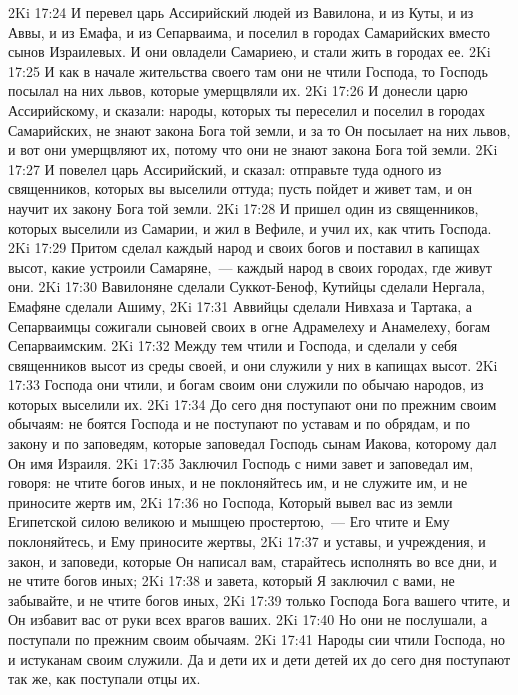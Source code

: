 \rsbpar\vs 2Ki 17:24 И перевел царь Ассирийский людей из Вавилона, и из Куты, и из Аввы, и из Емафа, и из Сепарваима, и поселил  в городах Самарийских вместо сынов Израилевых. И они овладели Самариею, и стали жить в городах ее.
\vs 2Ki 17:25 И как в начале жительства своего там они не чтили Господа, то Господь посылал на них львов, которые умерщвляли их.
\vs 2Ki 17:26 И донесли царю Ассирийскому, и сказали: народы, которых ты переселил и поселил в городах Самарийских, не знают закона Бога той земли, и за то Он посылает на них львов, и вот они умерщвляют их, потому что они не знают закона Бога той земли.
\vs 2Ki 17:27 И повелел царь Ассирийский, и сказал: отправьте туда одного из священников, которых вы выселили оттуда; пусть пойдет и живет там, и он научит их закону Бога той земли.
\vs 2Ki 17:28 И пришел один из священников, которых выселили из Самарии, и жил в Вефиле, и учил их, как чтить Господа.
\vs 2Ki 17:29 Притом сделал каждый народ и своих богов и поставил в капищах высот, какие устроили Самаряне,~--- каждый народ в своих городах, где живут они.
\vs 2Ki 17:30 Вавилоняне сделали Суккот-Беноф, Кутийцы сделали Нергала, Емафяне сделали Ашиму,
\vs 2Ki 17:31 Аввийцы сделали Нивхаза и Тартака, а Сепарваимцы сожигали сыновей своих в огне Адрамелеху и Анамелеху, богам Сепарваимским.
\vs 2Ki 17:32 Между тем чтили и Господа, и сделали у себя священников высот из среды своей, и они служили у них в капищах высот.
\vs 2Ki 17:33 Господа они чтили, и богам своим они служили по обычаю народов, из которых выселили их.
\vs 2Ki 17:34 До сего дня поступают они по прежним своим обычаям: не боятся Господа и не поступают по уставам и по обрядам, и по закону и по заповедям, которые заповедал Господь сынам Иакова, которому дал Он имя Израиля.
\vs 2Ki 17:35 Заключил Господь с ними завет и заповедал им, говоря: не чтите богов иных, и не поклоняйтесь им, и не служите им, и не приносите жертв им,
\vs 2Ki 17:36 но Господа, Который вывел вас из земли Египетской силою великою и мышцею простертою,~--- Его чтите и Ему поклоняйтесь, и Ему приносите жертвы,
\vs 2Ki 17:37 и уставы, и учреждения, и закон, и заповеди, которые Он написал вам, старайтесь исполнять во все дни, и не чтите богов иных;
\vs 2Ki 17:38 и завета, который Я заключил с вами, не забывайте, и не чтите богов иных,
\vs 2Ki 17:39 только Господа Бога вашего чтите, и Он избавит вас от руки всех врагов ваших.
\vs 2Ki 17:40 Но они не послушали, а поступали по прежним своим обычаям.
\vs 2Ki 17:41 Народы сии чтили Господа, но и истуканам своим служили. Да и дети их и дети детей их до сего дня поступают так же, как поступали отцы их.
